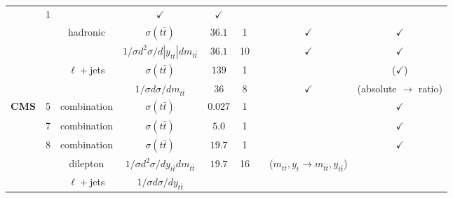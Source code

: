 \begin{table}[H]
\begin{center}
{\begin{tabular}{lcccccc|c|c}
      & 1
      & \cite{ATLAS:2019hau}
      & $\checkmark$
      & $\checkmark$\\
      &
      & hadronic
      & $\sigma(t \bar{t})$
      & $36.1$
      & 1
      & \cite{ATLAS:2020ccu}
      & $\checkmark$
      & $\checkmark$\\
      &
      &
      & $1/\sigma d^2\sigma/d|y_{t\bar{t}}|dm_{t\bar{t}}$
      & $36.1$
      & 10
      & \cite{ATLAS:2020ccu}
      & $\checkmark$
      & $\checkmark$\\
      & 
      & $\ell+$jets
      & $\sigma(t \bar{t})$
      & $139$
      & 1
      & \cite{ATLAS:2020aln}
      & 
      & ($\checkmark$) \\
      &
      & 
      & $1/\sigma d\sigma/dm_{t\bar{t}}$
      & $36$
      & 8
      & \cite{Aad:2019ntk}
      & $\checkmark$
      & (absolute $\rightarrow$ ratio)\\
     \midrule \midrule
       \multirow{1}{*}{\bf CMS}      & 5
      & combination
      & $\sigma(t \bar{t})$
      & 0.027
      & 1
      & \cite{CMS:2017zpm}
      & 
      & $\checkmark$\\ \midrule
      & 7
      & combination
      & $\sigma(t \bar{t})$
      & $5.0$
      & 1
      & \cite{Spannagel:2016cqt}
      & 
      & $\checkmark$\\\midrule
      & 8
      & combination
      & $\sigma(t \bar{t})$
      & $19.7$
      & 1
      & \cite{Spannagel:2016cqt}
      & 
      & $\checkmark$\\     
      &
      & dilepton
      & $1/\sigma d^2\sigma/dy_{t\bar{t}}dm_{t\bar{t}}$
      & $19.7$
      & 16
      & \cite{Sirunyan:2017azo}
      & ($m_{t\bar{t}}, y_t \rightarrow m_{t\bar{t}}, y_{t\bar{t}}$)
      & \\
      &
      & $\ell+$jets
      & $1/\sigma d\sigma/dy_{t\bar{t}}$

\end{tabular}}
\end{center}
\end{table}
